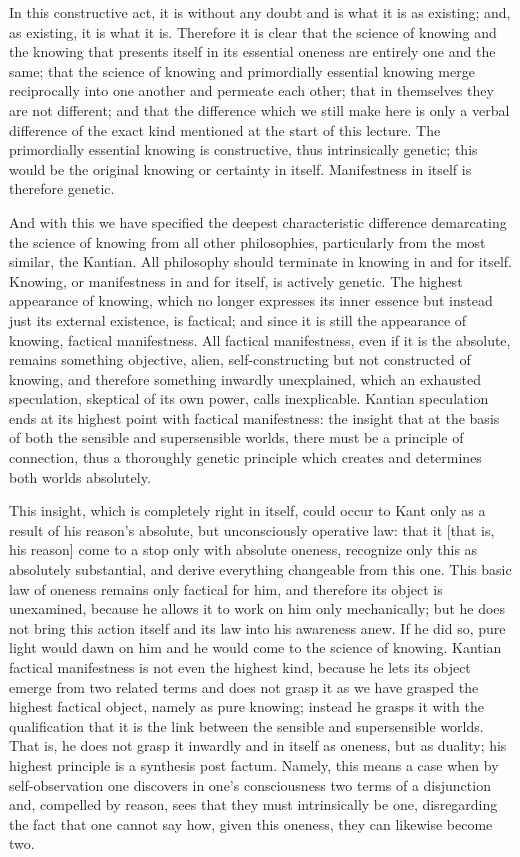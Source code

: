 In this constructive act, it is without any
doubt and is what it is as existing;
and, as existing, it is what it is.
Therefore it is clear that the science of knowing and
the knowing that presents itself in its essential oneness
are entirely one and the same;
that the science of knowing and primordially essential knowing
merge reciprocally into one another and permeate each other;
that in themselves they are not different;
and that the difference which we still make here is
only a verbal difference of the exact kind
mentioned at the start of this lecture.
The primordially essential knowing is constructive,
thus intrinsically genetic;
this would be the original knowing or certainty in itself.
Manifestness in itself is therefore genetic.

And with this we have specified the deepest characteristic difference
demarcating the science of knowing from all other philosophies,
particularly from the most similar, the Kantian.
All philosophy should terminate in knowing in and for itself.
Knowing, or manifestness in and for itself, is actively genetic.
The highest appearance of knowing, which no longer expresses its
inner essence but instead just its external existence, is factical;
and since it is still the appearance of knowing, factical manifestness.
All factical manifestness, even if it is the absolute, remains
something objective, alien, self-constructing but not constructed of knowing,
and therefore something inwardly unexplained, which an exhausted speculation,
skeptical of its own power, calls inexplicable.
Kantian speculation ends at its highest point with factical manifestness:
the insight that at the basis of both the sensible and supersensible worlds,
there must be a principle of connection, thus a thoroughly genetic principle
which creates and determines both worlds absolutely.

This insight, which is completely right in itself,
could occur to Kant only as a result of his reason's absolute,
but unconsciously operative law: that it [that is, his reason]
come to a stop only with absolute oneness,
recognize only this as absolutely substantial,
and derive everything changeable from this one.
This basic law of oneness remains only factical for him,
and therefore its object is unexamined, because he allows it
to work on him only mechanically; but he does not bring
this action itself and its law into his awareness anew.
If he did so, pure light would dawn on him and he would
come to the science of knowing.
Kantian factical manifestness is not even the highest kind,
because he lets its object emerge from two related terms and
does not grasp it as we have grasped the highest factical object,
namely as pure knowing;
instead he grasps it with the qualification that
it is the link between the sensible and supersensible worlds.
That is, he does not grasp it inwardly
and in itself as oneness, but as duality;
his highest principle is a synthesis post factum.
Namely, this means a case when by self-observation one discovers
in one's consciousness two terms of a disjunction and,
compelled by reason, sees that they must intrinsically be one,
disregarding the fact that one cannot say how, given this oneness,
they can likewise become two.

